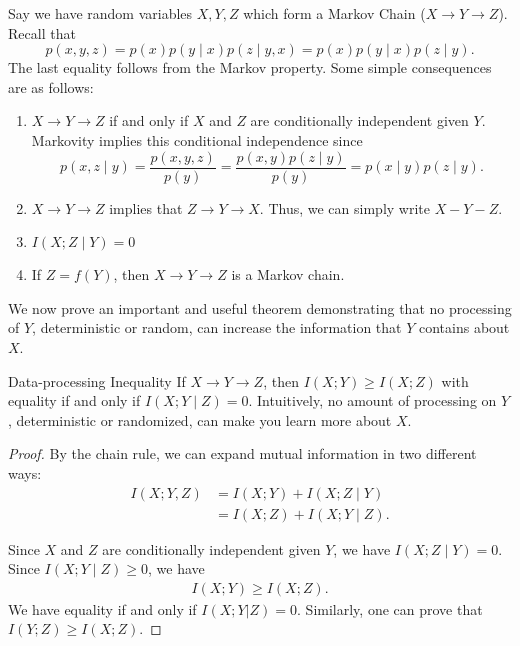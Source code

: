 \begin{defn}{}{}
Say we have random variables \(X,Y,Z\) which form a Markov Chain (\(X \to Y\to Z\)). Recall that
\[
    p(x,y,z) = p(x)p(y\mid x)p(z\mid y,x) = p(x)p(y\mid x)p(z\mid y). 
\]
The last equality follows from  the Markov property. Some simple consequences are as follows:


\begin{enumerate}
    \item \(X \to Y \to Z\) if and only if \(X\) and \(Z\) are conditionally independent given \(Y\). Markovity implies this conditional independence since
    \[
        p(x, z\mid y) = \frac{p(x,y,z)}{p(y)} = \frac{p(x,y)p(z \mid y)}{p(y)} = p(x \mid y)p(z \mid y).   
    \]
    \item \(X \to Y \to Z\) implies that \(Z \to  Y \to  X\). Thus, we can simply write \(X - Y - Z\).  
    \item \(I(X;Z\mid Y) = 0\)  
    \item If \(Z = f(Y)\), then \(X \to Y \to Z\) is a Markov chain.
\end{enumerate}

\end{defn}


We now prove an important and useful theorem demonstrating that no processing of \(Y\), deterministic or random, can increase the information that \(Y\) contains about \(X\).  

\begin{thrm}{Data-processing Inequality }{}
If \(X \to Y \to Z\), then \(I(X;Y)\geq I(X;Z)\) with equality if and only if \(I(X;Y \mid Z) = 0\).  Intuitively, no amount of processing on \(Y\), deterministic or randomized, can make you learn more about \(X\). 

\tcbline
\begin{proof}
By the chain rule, we can expand mutual information in two different ways:
\begin{align*}
    I(X;Y, Z) &=  I(X;Y) + I(X;Z \mid Y)\\
    &=  I(X;Z) + I(X;Y \mid Z).
\end{align*}

Since \(X\) and \(Z\) are conditionally independent given \(Y\), we have \(I(X;Z \mid Y) = 0\). Since \(I(X;Y \mid Z) \geq 0\), we have 
\begin{align*}
    I(X;Y) \geq I(X;Z). 
\end{align*}
We have equality if and only if \(I(X; Y |Z) = 0\). Similarly, one can prove that \(I(Y;Z) \geq I(X;Z)\). 
\end{proof}

\end{thrm}

